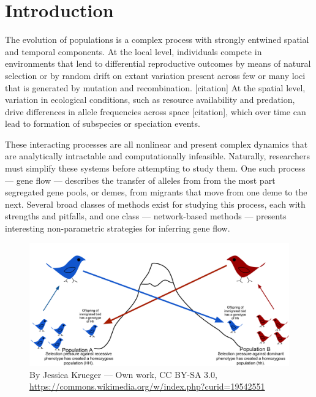 \documentclass{essay}
\begin{document}
\sffamily


\section{Introduction}

The evolution of populations is a complex process with strongly entwined
spatial and temporal components. At the local level, individuals compete in
environments that lend to differential reproductive outcomes by means of
natural selection or by random drift on extant variation present across few or
many loci that is generated by mutation and recombination. [citation] At the
spatial level, variation in ecological conditions, such as resource
availability and predation, drive differences in allele frequencies across
space [citation], which over time can lead to formation of subspecies or
speciation events.

These interacting processes are all nonlinear and present complex dynamics that
are analytically intractable and computationally infeasible. Naturally,
researchers must simplify these systems before attempting to study them. One
such process --- gene flow --- describes the transfer of alleles from
from the most part segregated gene pools, or demes, from migrants that move
from one deme to the next. Several broad classes of methods exist for studying
this process, each with strengths and pitfalls, and one class --- network-based
methods --- presents interesting non-parametric strategies for inferring gene
flow.

\begin{figure}
  \includegraphics[width=\linewidth]{../Figures/Gene_flow_final.png}
  \caption{By Jessica Krueger --- Own work, CC BY-SA 3.0,
  \url{https://commons.wikimedia.org/w/index.php?curid=19542551}}
\end{figure}
\end{document}
